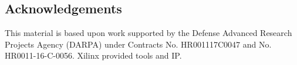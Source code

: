 \documentclass[sigconf]{acmart}
\begin{document}



\maketitle








\subsection*{Acknowledgements}
This material is based upon work supported by the Defense Advanced
Research Projects Agency (DARPA) under Contracts No. HR001117C0047
and No. HR0011-16-C-0056.
Xilinx provided tools and IP.



\end{document}
